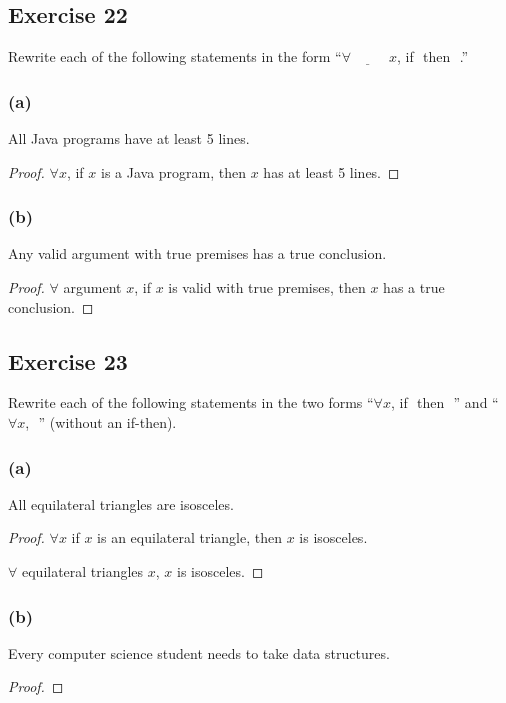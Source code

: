 \documentclass[14pt]{extarticle}
\newcommand{\fbl}{\underline{\hspace{1cm}}\,\,}
\newcommand{\fa}{\forall}
\begin{document}
\subsection{Exercise 22}
Rewrite each of the following statements in the form “$\fa \fbl x$, if \fbl then \fbl.”

\subsubsection{(a)}
All Java programs have at least 5 lines.

\begin{proof}
    $\fa x$, if $x$ is a Java program, then $x$ has at least 5 lines.
\end{proof}

\subsubsection{(b)}
Any valid argument with true premises has a true conclusion.

\begin{proof}
    $\fa$ argument $x$, if $x$ is valid with true premises, then $x$ has a true conclusion.
\end{proof}

\subsection{Exercise 23}
Rewrite each of the following statements in the two forms “$\fa x$, if \fbl then \fbl” and “$\fa x$, \fbl” (without an if-then).

\subsubsection{(a)}
All equilateral triangles are isosceles.

\begin{proof}
    $\fa x$ if $x$ is an equilateral triangle, then $x$ is isosceles.

    $\fa$ equilateral triangles $x$, $x$ is isosceles.
\end{proof}

\subsubsection{(b)}
Every computer science student needs to take data structures.

\begin{proof}

\end{proof}
\end{document}
